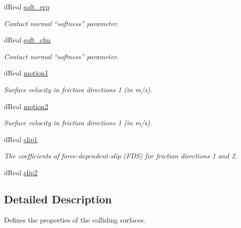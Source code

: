 \begin{DoxyCompactItemize}
dReal \hyperlink{struct_tao_1_1_ode_1_1_ode_1_1d_surface_parameters_a8823dedc4e6e8a71f5ac77c64e5e78e0}{soft\_\-erp}
\begin{DoxyCompactList}\small\item\em Contact normal ``softness'' parameter. \item\end{DoxyCompactList}\item 
dReal \hyperlink{struct_tao_1_1_ode_1_1_ode_1_1d_surface_parameters_adb1e3b96c1e72c91f5f2a08efdcb8261}{soft\_\-cfm}
\begin{DoxyCompactList}\small\item\em Contact normal ``softness'' parameter. \item\end{DoxyCompactList}\item 
dReal \hyperlink{struct_tao_1_1_ode_1_1_ode_1_1d_surface_parameters_a9c1e4fb56115f862e4b74f04ecbdf73d}{motion1}
\begin{DoxyCompactList}\small\item\em Surface velocity in friction directions 1 (in m/s). \item\end{DoxyCompactList}\item 
dReal \hyperlink{struct_tao_1_1_ode_1_1_ode_1_1d_surface_parameters_a04243c207c92edb82d524c91422f2baf}{motion2}
\begin{DoxyCompactList}\small\item\em Surface velocity in friction directions 1 (in m/s). \item\end{DoxyCompactList}\item 
dReal \hyperlink{struct_tao_1_1_ode_1_1_ode_1_1d_surface_parameters_a6fe751650e76028f7367e75a606817ae}{slip1}
\begin{DoxyCompactList}\small\item\em The coefficients of force-\/dependent-\/slip (FDS) for friction directions 1 and 2. \item\end{DoxyCompactList}\item 
dReal \hyperlink{struct_tao_1_1_ode_1_1_ode_1_1d_surface_parameters_af7197edb7b0a6bb33e1d20298e7bed79}{slip2}
\end{DoxyCompactItemize}


\subsection{Detailed Description}
Defines the properties of the colliding surfaces. 

